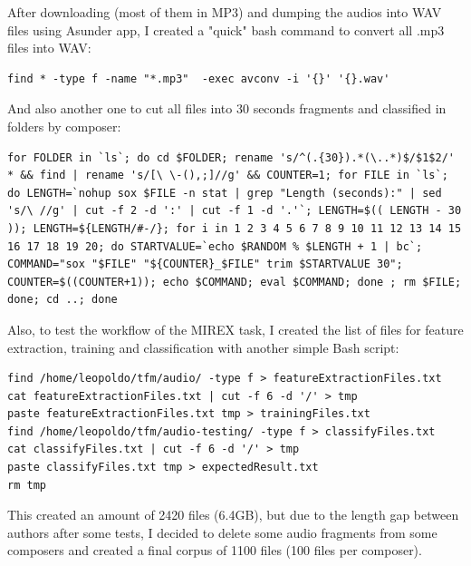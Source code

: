 \documentclass[a4paper,openany,oneside,12pt]{book}
\begin{document}
After downloading (most of them in MP3) and dumping the audios into WAV files using Asunder app, I created a "quick" bash command to convert all .mp3 files into WAV:
\lstset{language=Bash,
           basicstyle=\ttfamily\scriptsize,
           keywordstyle=\ttfamily,
           stringstyle=\ttfamily,
           commentstyle=\ttfamily,
          breaklines=true
          }
\begin{lstlisting}
find * -type f -name "*.mp3"  -exec avconv -i '{}' '{}.wav'
\end{lstlisting}

And also another one to cut all files into 30 seconds fragments and classified in folders by composer:
\lstset{language=Bash,
           basicstyle=\ttfamily\scriptsize,
           keywordstyle=\ttfamily,
           stringstyle=\ttfamily,
           commentstyle=\ttfamily,
          breaklines=true
          }
\begin{lstlisting}
for FOLDER in `ls`; do cd $FOLDER; rename 's/^(.{30}).*(\..*)$/$1$2/' * && find | rename 's/[\ \-(),;]//g' && COUNTER=1; for FILE in `ls`; do LENGTH=`nohup sox $FILE -n stat | grep "Length (seconds):" | sed 's/\ //g' | cut -f 2 -d ':' | cut -f 1 -d '.'`; LENGTH=$(( LENGTH - 30 )); LENGTH=${LENGTH/#-/}; for i in 1 2 3 4 5 6 7 8 9 10 11 12 13 14 15 16 17 18 19 20; do STARTVALUE=`echo $RANDOM % $LENGTH + 1 | bc`; COMMAND="sox "$FILE" "${COUNTER}_$FILE" trim $STARTVALUE 30"; COUNTER=$((COUNTER+1)); echo $COMMAND; eval $COMMAND; done ; rm $FILE; done; cd ..; done
\end{lstlisting}

Also, to test the workflow of the MIREX task, I created the list of files for feature extraction, training and classification with another simple Bash script:

\lstset{language=Bash,
           basicstyle=\ttfamily\scriptsize,
           keywordstyle=\ttfamily,
           stringstyle=\ttfamily,
           commentstyle=\ttfamily,
          breaklines=true
          }
\begin{lstlisting}
find /home/leopoldo/tfm/audio/ -type f > featureExtractionFiles.txt
cat featureExtractionFiles.txt | cut -f 6 -d '/' > tmp
paste featureExtractionFiles.txt tmp > trainingFiles.txt
find /home/leopoldo/tfm/audio-testing/ -type f > classifyFiles.txt
cat classifyFiles.txt | cut -f 6 -d '/' > tmp
paste classifyFiles.txt tmp > expectedResult.txt
rm tmp
\end{lstlisting}


This created an amount of 2420 files (6.4GB), but due to the length gap between authors after some tests, I decided to delete some audio fragments from some composers and created a final corpus of 1100 files (100 files per composer).
\end{document}
